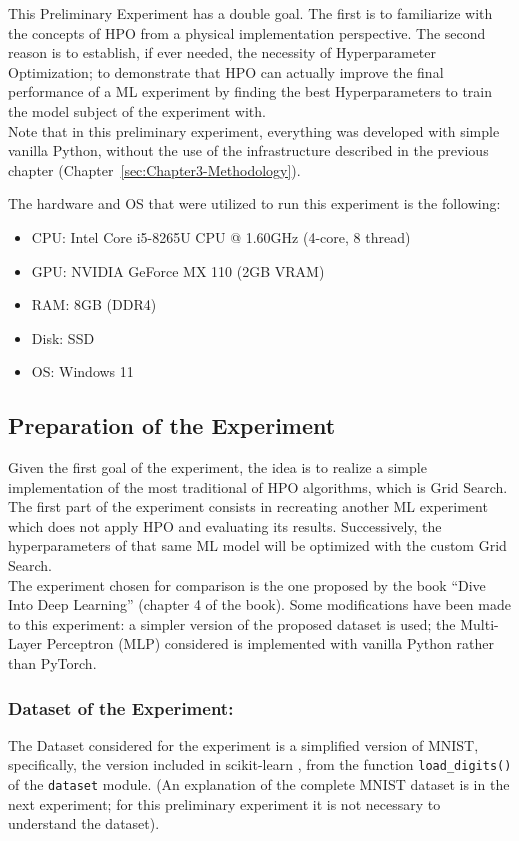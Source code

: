 This Preliminary Experiment has a double goal.
The first is to familiarize with the concepts of HPO from a physical implementation perspective.
The second reason is to establish, if ever needed, the necessity of Hyperparameter Optimization; to demonstrate that HPO can actually improve the final performance of a ML experiment by finding the best Hyperparameters to train the model subject of the experiment with.
\\[0.3cm]Note that in this preliminary experiment, everything was developed with simple vanilla Python, without the use of the infrastructure described in the previous chapter (Chapter~\ref{sec:Chapter3-Methodology}).

The hardware and OS that were utilized to run this experiment is the following:
\begin{itemize}[itemsep=0.1cm]
    \item CPU: Intel Core i5-8265U CPU @ 1.60GHz (4-core, 8 thread)
    \item GPU: NVIDIA GeForce MX 110 (2GB VRAM)
    \item RAM: 8GB (DDR4)
    \item Disk: SSD
    \item OS: Windows 11
\end{itemize}

\subsection{Preparation of the Experiment}

Given the first goal of the experiment, the idea is to realize a simple implementation of the most traditional of HPO algorithms, which is Grid Search.
\\[0.3cm]The first part of the experiment consists in recreating another ML experiment which does not apply HPO and evaluating its results. Successively, the hyperparameters of that same ML model will be optimized with the custom Grid Search.
\\[0.3cm]The experiment chosen for comparison is the one proposed by the book “Dive Into Deep Learning” \cite{Tesi-1.6} (chapter 4 of the book). Some modifications have been made to this experiment: a simpler version of the proposed dataset is used; the Multi-Layer Perceptron (MLP) considered is implemented with vanilla Python rather than PyTorch.

\subsubsection{Dataset of the Experiment:}
The Dataset considered for the experiment is a simplified version of MNIST, specifically, the version included in scikit-learn \cite{scikit-learn}, from the function \texttt{load\_digits()} of the \texttt{dataset} module. (An explanation of the complete MNIST dataset is in the next experiment; for this preliminary experiment it is not necessary to understand the dataset).

